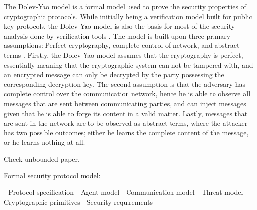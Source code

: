 The Dolev-Yao model is a formal model used to prove the security properties of cryptographic protocols. While initially being a verification model built for public key protocols, the Dolev-Yao model is also the basis for most of the security analysis done by verification tools \cite{cremers2005operational}. The model is built upon three primary assumptions: Perfect cryptography, complete control of network, and abstract terms \cite{dolev1983security}. Firstly, the Dolev-Yao model assumes that the cryptography is perfect, essentially meaning that the cryptographic system can not be tampered with, and an encrypted message can only be decrypted by the party possessing the corresponding decryption key. The second assumption is that the adversary has complete control over the communication network, hence he is able to observe all messages that are sent between communicating parties, and can inject messages given that he is able to forge its content in a valid matter. Lastly, messages that are sent in the network are to be observed as abstract terms, where the attacker has two possible outcomes; either he learns the complete content of the message, or he learns nothing at all. 

Check unbounded paper.

Formal security protocol model\cite{cremers2005operational}:

- Protocol specification
- Agent model
- Communication model
- Threat model
- Cryptographic primitives
- Security requirements


